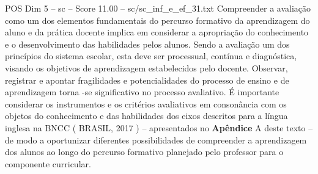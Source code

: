 \begin{textsample}{POS Dim 5 – sc – Score 11.00 – sc/sc\_inf\_e\_ef\_31.txt}
Compreender a avaliação como um dos elementos fundamentais do percurso formativo da aprendizagem do aluno e da prática docente implica em considerar a apropriação do conhecimento e o desenvolvimento das habilidades pelos alunos.
Sendo a avaliação um dos princípios do sistema escolar, esta deve ser processual, contínua e diagnóstica, visando os objetivos de aprendizagem estabelecidos pelo docente.
Observar, registrar e apontar fragilidades e potencialidades do processo de ensino e de aprendizagem torna -se significativo no processo avaliativo.
É importante considerar os instrumentos e os critérios avaliativos em consonância com os objetos do conhecimento e das habilidades dos eixos descritos para a língua inglesa na BNCC ( BRASIL, 2017 ) – apresentados no \textbf{Apêndice} A deste texto – de modo a oportunizar diferentes possibilidades de compreender a aprendizagem dos alunos ao longo do percurso formativo planejado pelo professor para o componente curricular.

\end{textsample}

